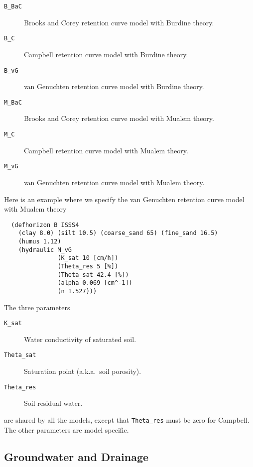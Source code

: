 \documentclass[a4paper,11pt]{article}
\begin{document}
\begin{description}
\item[\texttt{B\_BaC}] Brooks and Corey retention curve model with
  Burdine theory.
\item[\texttt{B\_C}] Campbell retention curve model with Burdine
  theory.
\item[\texttt{B\_vG}] van Genuchten retention curve model with Burdine
  theory.
\item[\texttt{M\_BaC}] Brooks and Corey retention curve model with
  Mualem theory.
\item[\texttt{M\_C}] Campbell retention curve model with Mualem
  theory.
\item[\texttt{M\_vG}] van Genuchten retention curve model with Mualem
  theory.
\end{description}

Here is an example where we specify the van Genuchten retention curve
model with Mualem theory
\begin{verbatim}
  (defhorizon B ISSS4
    (clay 8.0) (silt 10.5) (coarse_sand 65) (fine_sand 16.5)
    (humus 1.12)
    (hydraulic M_vG
               (K_sat 10 [cm/h])
               (Theta_res 5 [%])
               (Theta_sat 42.4 [%])
               (alpha 0.069 [cm^-1])
               (n 1.527)))
\end{verbatim}

The three parameters
\begin{description}
\item[\texttt{K\_sat}] Water conductivity of saturated soil.
\item[\texttt{Theta\_sat}] Saturation point (a.k.a.\ soil porosity).
\item[\texttt{Theta\_res}] Soil residual water.
\end{description}
are shared by all the models, except that \texttt{Theta\_res} must be
zero for Campbell.  The other parameters are model specific.

\subsection{Groundwater and Drainage}
\label{sec:groundwater}
\end{document}
